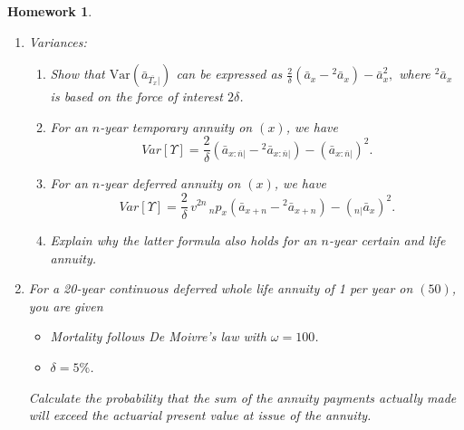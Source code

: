\documentclass[11pt,fleqn,oneside]{book}
\newtheorem{homework}{Homework}
\begin{document}
\begin{homework}
\label{HW16}
\begin{enumerate}
\item Variances:
\begin{enumerate}
\item Show that $\text{Var}\left(\bar{a}_{\overline{T_x}|}\right)$ can be expressed as $\frac{2}{\delta}\left(\bar{a}_x - {^2\bar{a}_x}\right) - \bar{a}_x^2,$ where $^2\bar{a}_x$ is based on the force of interest $2\delta$.
\item For an $n$-year temporary annuity on $(x)$, we have
$$
Var[\Upsilon] =  \frac{2}{\delta} \left({\bar{a}_{x:\overline{n}|}} - {^2\bar{a}_{x:\overline{n}|}}\right) - \left({\bar{a}_{x:\overline{n}|}}\right)^2.
$$
\item For an $n$-year deferred annuity on $(x)$, we have
$$
Var[\Upsilon] =  \frac{2}{\delta} \,v^{2n}\,{_np_x}\left({\bar{a}_{x+n}} - {^2\bar{a}_{x+n}}\right) - \left({_{n|}\bar{a}_{x}}\right)^2.
$$
\item Explain why the latter formula also holds for an $n$-year certain and life annuity.
\end{enumerate} 
\item For a 20-year continuous deferred whole life annuity of 1 per year on $(50)$, you are given
\begin{itemize}
\item Mortality follows De Moivre's law with $\omega = 100$.
\item $\delta=5\%$.
\end{itemize}
Calculate the probability that the sum of the annuity payments actually made will exceed the actuarial present value at issue of the annuity.
\end{enumerate}
\end{homework}
\end{document}
